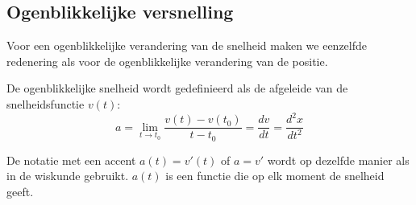 \documentclass{ximera}
\begin{document}
\subsection{Ogenblikkelijke versnelling}

Voor een ogenblikkelijke verandering van de snelheid maken we eenzelfde redenering als voor de ogenblikkelijke verandering van de positie.

\begin{definition}
De ogenblikkelijke snelheid wordt gedefinieerd als de afgeleide van de snelheidsfunctie \(v(t)\):
\[
a=\lim_{t\to t_0}\frac{v(t)-v(t_0)}{t-t_0} = \frac{dv}{dt}=\frac{d^2x}{dt^2}
\]

De notatie met een accent $a(t)=v'(t)$ of $a=v'$ wordt op dezelfde manier als in de wiskunde gebruikt. $a(t)$ is een functie die op elk moment de snelheid geeft. 
\end{definition}
	
	
\end{document}

